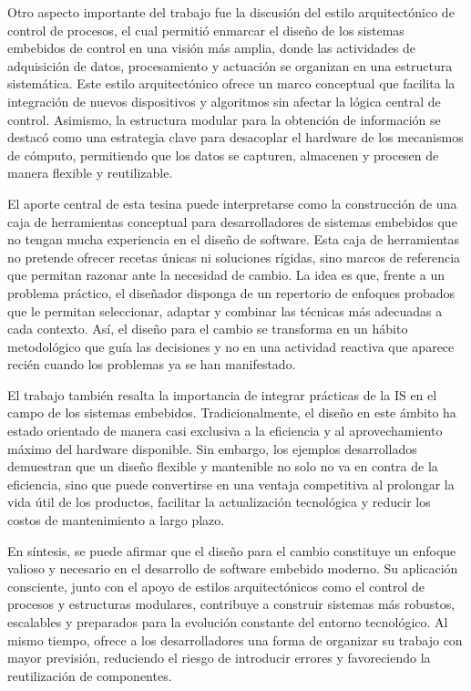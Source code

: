 Otro aspecto importante del trabajo fue la discusión del estilo arquitectónico de control de procesos, el cual permitió enmarcar el diseño de los sistemas embebidos de control en una visión más amplia, donde las actividades de adquisición de datos, procesamiento y actuación se organizan en una estructura sistemática. Este estilo arquitectónico ofrece un marco conceptual que facilita la integración de nuevos dispositivos y algoritmos sin afectar la lógica central de control. Asimismo, la estructura modular para la obtención de información se destacó como una estrategia clave para desacoplar el hardware de los mecanismos de cómputo, permitiendo que los datos se capturen, almacenen y procesen de manera flexible y reutilizable.

El aporte central de esta tesina puede interpretarse como la construcción de una caja de herramientas conceptual para desarrolladores de sistemas embebidos que no tengan mucha experiencia en el diseño de software. Esta caja de herramientas no pretende ofrecer recetas únicas ni soluciones rígidas, sino marcos de referencia que permitan razonar ante la necesidad de cambio. La idea es que, frente a un problema práctico, el diseñador disponga de un repertorio de enfoques probados que le permitan seleccionar, adaptar y combinar las técnicas más adecuadas a cada contexto. Así, el diseño para el cambio se transforma en un hábito metodológico que guía las decisiones y no en una actividad reactiva que aparece recién cuando los problemas ya se han manifestado.

El trabajo también resalta la importancia de integrar prácticas de la \gls{IS} en el campo de los sistemas embebidos. Tradicionalmente, el diseño en este ámbito ha estado orientado de manera casi exclusiva a la eficiencia y al aprovechamiento máximo del hardware disponible. Sin embargo, los ejemplos desarrollados demuestran que un diseño flexible y mantenible no solo no va en contra de la eficiencia, sino que puede convertirse en una ventaja competitiva al prolongar la vida útil de los productos, facilitar la actualización tecnológica y reducir los costos de mantenimiento a largo plazo.

En síntesis, se puede afirmar que el diseño para el cambio constituye un enfoque valioso y necesario en el desarrollo de software embebido moderno. Su aplicación consciente, junto con el apoyo de estilos arquitectónicos como el control de procesos y estructuras modulares, contribuye a construir sistemas más robustos, escalables y preparados para la evolución constante del entorno tecnológico. Al mismo tiempo, ofrece a los desarrolladores una forma de organizar su trabajo con mayor previsión, reduciendo el riesgo de introducir errores y favoreciendo la reutilización de componentes.